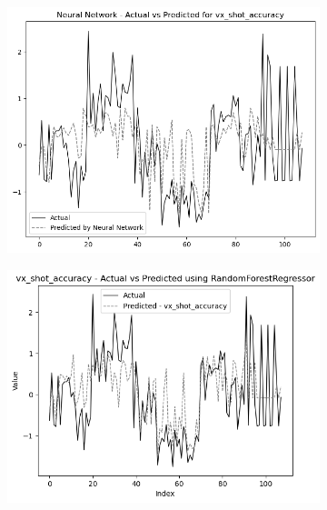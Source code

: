 \begin{figure}
    \begin{subfigure}[b]{0.49\textwidth}
        \centering
        \includegraphics[width=\textwidth]{images/nnCharts/all_data_visual_shot_accuracy.png}
    \end{subfigure}\hfill
    \begin{subfigure}[b]{0.49\textwidth}
        \centering
        \includegraphics[width=\textwidth]{images/regressionCharts/all_data_visual_shot_accuracy.png}
    \end{subfigure}


\end{figure}
